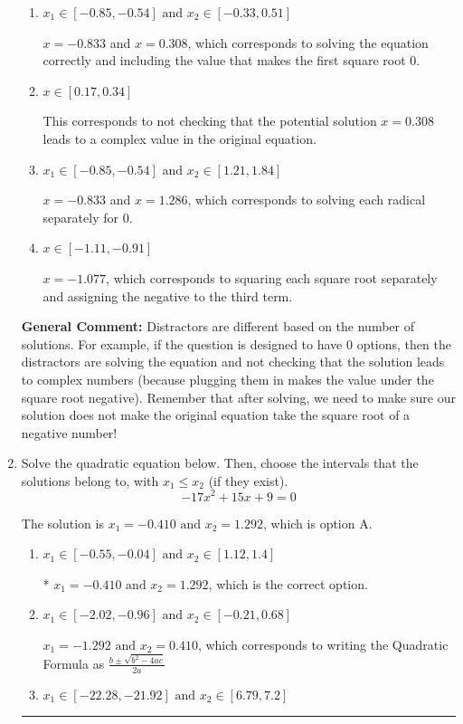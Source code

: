 \documentclass{extbook}[14pt]
\newcommand{\litem}[1]{\item #1

\rule{\textwidth}{0.4pt}}
\begin{document}
\begin{enumerate}
{\begin{enumerate}[label=\Alph*.]
*$x = 0.308$ leads to a complex value in the equation, so this is the correct option.
\item \( x_1 \in [-0.85, -0.54] \text{ and } x_2 \in [-0.33,0.51] \)

$x = -0.833$ and $x = 0.308$, which corresponds to solving the equation correctly and including the value that makes the first square root 0.
\item \( x \in [0.17,0.34] \)

This corresponds to not checking that the potential solution $x = 0.308$ leads to a complex value in the original equation.
\item \( x_1 \in [-0.85, -0.54] \text{ and } x_2 \in [1.21,1.84] \)

$x = -0.833$ and $x = 1.286$, which corresponds to solving each radical separately for 0.
\item \( x \in [-1.11,-0.91] \)

$x = -1.077$, which corresponds to squaring each square root separately and assigning the negative to the third term.
\end{enumerate}

\textbf{General Comment:} Distractors are different based on the number of solutions. For example, if the question is designed to have 0 options, then the distractors are solving the equation and not checking that the solution leads to complex numbers (because plugging them in makes the value under the square root negative). Remember that after solving, we need to make sure our solution does not make the original equation take the square root of a negative number!
}
\litem{
Solve the quadratic equation below. Then, choose the intervals that the solutions belong to, with $x_1 \leq x_2$ (if they exist).
\[ -17x^{2} +15 x + 9 = 0 \]

The solution is \( x_1 = -0.410 \text{ and } x_2 = 1.292 \), which is option A.\begin{enumerate}[label=\Alph*.]
\item \( x_1 \in [-0.55, -0.04] \text{ and } x_2 \in [1.12, 1.4] \)

* $x_1 = -0.410 \text{ and } x_2 = 1.292$, which is the correct option.
\item \( x_1 \in [-2.02, -0.96] \text{ and } x_2 \in [-0.21, 0.68] \)

 $x_1 = -1.292 \text{ and } x_2 = 0.410$, which corresponds to writing the Quadratic Formula as $\frac{b \pm \sqrt{b^2 - 4ac}}{2a}$
\item \( x_1 \in [-22.28, -21.92] \text{ and } x_2 \in [6.79, 7.2] \)


\end{enumerate}}
\end{enumerate}
\end{document}
